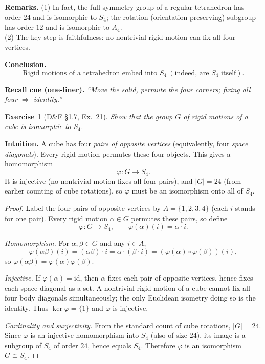 \documentclass[12pt]{article}
\newtheorem{exercise}[theorem]{Exercise}
\theoremstyle{definition}
\begin{document}
\noindent\textbf{Remarks.}
(1) In fact, the full symmetry group of a regular tetrahedron has order $24$ and is isomorphic to $S_4$; the rotation (orientation-preserving) subgroup has order $12$ and is isomorphic to $A_4$.\\
(2) The key step is faithfulness: no nontrivial rigid motion can fix all four vertices.

\medskip
\noindent\textbf{Conclusion.}
\[
\boxed{\ \text{Rigid motions of a tetrahedron embed into }S_4\ (\text{indeed, are }S_4\text{ itself}).\ }
\]

\medskip
\noindent\textbf{Recall cue (one-liner).} \emph{“Move the solid, permute the four corners; fixing all four $\Rightarrow$ identity.”}

\newpage

\begin{exercise}[D\&F §1.7, Ex.~21]
Show that the group $G$ of rigid motions of a cube is isomorphic to $S_4$.
\end{exercise}

\dotfill

\noindent\textbf{Intuition.}
A cube has four \emph{pairs of opposite vertices} (equivalently, four \emph{space diagonals}).
Every rigid motion permutes these four objects. This gives a homomorphism
\[
\varphi:G\longrightarrow S_4.
\]
It is injective (no nontrivial motion fixes all four pairs), and $|G|=24$ (from earlier counting of cube rotations),
so $\varphi$ must be an isomorphism onto all of $S_4$.

\dotfill

\begin{proof}
Label the four pairs of opposite vertices by $A=\{1,2,3,4\}$ (each $i$ stands for one pair).
Every rigid motion $\alpha\in G$ permutes these pairs, so define
\[
\varphi:G\to S_4,\qquad \varphi(\alpha)(i)=\alpha\cdot i.
\]

\smallskip
\noindent\emph{Homomorphism.}
For $\alpha,\beta\in G$ and any $i\in A$,
\[
\varphi(\alpha\beta)(i)=(\alpha\beta)\cdot i=\alpha\cdot(\beta\cdot i)
=(\varphi(\alpha)\circ\varphi(\beta))(i),
\]
so $\varphi(\alpha\beta)=\varphi(\alpha)\varphi(\beta)$.

\smallskip
\noindent\emph{Injective.}
If $\varphi(\alpha)=\mathrm{id}$, then $\alpha$ fixes each pair of opposite vertices, hence fixes each space diagonal as a set. 
A nontrivial rigid motion of a cube cannot fix all four body diagonals simultaneously; the only Euclidean isometry doing so is the identity.
Thus $\ker\varphi=\{1\}$ and $\varphi$ is injective.

\smallskip
\noindent\emph{Cardinality and surjectivity.}
From the standard count of cube rotations, $|G|=24$.
Since $\varphi$ is an injective homomorphism into $S_4$ (also of size $24$), its image is a subgroup of $S_4$ of order $24$,
hence equals $S_4$. Therefore $\varphi$ is an isomorphism $G\cong S_4$.
\end{proof}
\end{document}
